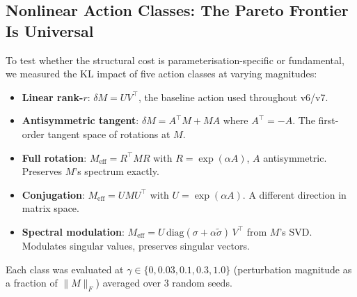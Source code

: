 \documentclass[11pt, a4paper]{article}
\theoremstyle{plain}
\theoremstyle{definition}
\theoremstyle{remark}
\begin{document}
\subsection{Nonlinear Action Classes: The Pareto Frontier Is Universal}
\label{sec:nonlinear-actions}

To test whether the structural cost is parameterisation-specific or fundamental, we measured the KL impact of five action classes at varying magnitudes:

\begin{itemize}[nosep]
\item \textbf{Linear rank-$r$}: $\delta M = U V^{\!\top}$, the baseline action used throughout v6/v7.
\item \textbf{Antisymmetric tangent}: $\delta M = A^{\!\top} M + M A$ where $A^{\!\top} = -A$. The first-order tangent space of rotations at $M$.
\item \textbf{Full rotation}: $M_{\text{eff}} = R^{\!\top} M R$ with $R = \exp(\alpha A)$, $A$ antisymmetric. Preserves $M$'s spectrum exactly.
\item \textbf{Conjugation}: $M_{\text{eff}} = U M U^{\!\top}$ with $U = \exp(\alpha A)$. A different direction in matrix space.
\item \textbf{Spectral modulation}: $M_{\text{eff}} = U \, \mathrm{diag}(\sigma + \alpha \tilde\sigma)\, V^{\!\top}$ from $M$'s SVD. Modulates singular values, preserves singular vectors.
\end{itemize}

Each class was evaluated at $\gamma \in \{0, 0.03, 0.1, 0.3, 1.0\}$ (perturbation magnitude as a fraction of $\|M\|_F$) averaged over 3 random seeds.
\end{document}
